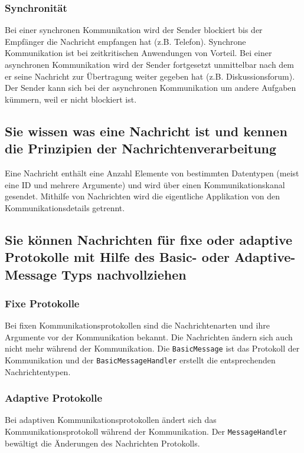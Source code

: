 \subsubsection{Synchronität}

Bei einer synchronen Kommunikation wird der Sender blockiert bis der Empfänger die Nachricht empfangen hat (z.B. Telefon). Synchrone Kommunikation ist bei zeitkritischen Anwendungen von Vorteil. Bei einer asynchronen Kommunikation wird der Sender fortgesetzt unmittelbar nach dem er seine Nachricht zur Übertragung weiter gegeben hat (z.B. Diskussionsforum). Der Sender kann sich bei der asynchronen Kommunikation um andere Aufgaben kümmern, weil er nicht blockiert ist.

\subsection{Sie wissen was eine Nachricht ist und kennen die Prinzipien der Nachrichtenverarbeitung}

Eine Nachricht enthält eine Anzahl Elemente von bestimmten Datentypen (meist eine ID und mehrere Argumente) und wird über einen Kommunikationskanal gesendet. Mithilfe von Nachrichten wird die eigentliche Applikation von den Kommunikationsdetails getrennt.

\subsection{Sie können Nachrichten für fixe oder adaptive Protokolle mit Hilfe des Basic- oder Adaptive-Message Typs nachvollziehen}

\subsubsection{Fixe Protokolle}

Bei fixen Kommunikationsprotokollen sind die Nachrichtenarten und ihre Argumente vor der Kommunikation bekannt. Die Nachrichten ändern sich auch nicht mehr während der Kommunikation. Die \texttt{BasicMessage} ist das Protokoll der Kommunikation und der \texttt{BasicMessageHandler} erstellt die entsprechenden Nachrichtentypen.

\subsubsection{Adaptive Protokolle}

Bei adaptiven Kommunikationsprotokollen ändert sich das Kommunikationsprotokoll während der Kommunikation. Der \texttt{MessageHandler} bewältigt die Änderungen des Nachrichten Protokolls.

